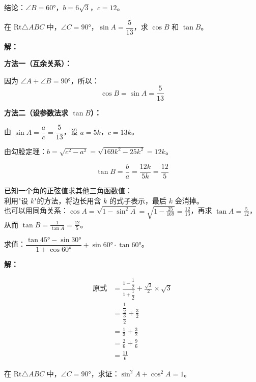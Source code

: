\documentclass[12pt, a4paper]{ctexart}
\begin{document}
结论：$\angle B=60°$，$b=6\sqrt{3}$，$c=12$。

\begin{examplebox}[【例题4】互余关系的应用]
在 $\text{Rt}\triangle ABC$ 中，$\angle C=90°$，$\sin A = \dfrac{5}{13}$，求 $\cos B$ 和 $\tan B$。
\end{examplebox}

\textbf{解：}

\textbf{方法一（互余关系）：}

因为 $\angle A + \angle B = 90°$，所以：
\[
\cos B = \sin A = \boxed{\frac{5}{13}}
\]

\textbf{方法二（设参数法求 $\tan B$）：}

由 $\sin A = \dfrac{a}{c} = \dfrac{5}{13}$，设 $a = 5k$，$c = 13k$。

由勾股定理：$b = \sqrt{c^2-a^2} = \sqrt{169k^2-25k^2} = 12k$。

\[
\tan B = \frac{b}{a} = \frac{12k}{5k} = \boxed{\frac{12}{5}}
\]

\begin{tipbox}[方法小结]
已知一个角的正弦值求其他三角函数值：\\
利用"设 $k$"的方法，将边长用含 $k$ 的式子表示，最后 $k$ 会消掉。\\
也可以用同角关系：$\cos A = \sqrt{1-\sin^2 A} = \sqrt{1-\frac{25}{169}} = \frac{12}{13}$，再求 $\tan A = \frac{5}{12}$，从而 $\tan B = \frac{1}{\tan A} = \frac{12}{5}$。
\end{tipbox}

\begin{examplebox}
求值：$\dfrac{\tan 45° - \sin 30°}{1 + \cos 60°} + \sin 60° \cdot \tan 60°$。
\end{examplebox}

\textbf{解：}

\begin{align*}
\text{原式} &= \frac{1 - \dfrac{1}{2}}{1 + \dfrac{1}{2}} + \frac{\sqrt{3}}{2} \times \sqrt{3} \\[8pt]
&= \frac{\dfrac{1}{2}}{\dfrac{3}{2}} + \frac{3}{2} \\[8pt]
&= \frac{1}{3} + \frac{3}{2} \\[8pt]
&= \frac{2}{6} + \frac{9}{6} \\[8pt]
&= \boxed{\frac{11}{6}}
\end{align*}

\begin{examplebox}[【例题6】同角关系证明——$\sin^2 A + \cos^2 A = 1$]
在 $\text{Rt}\triangle ABC$ 中，$\angle C=90°$，求证：$\sin^2 A + \cos^2 A = 1$。
\end{examplebox}
\end{document}
